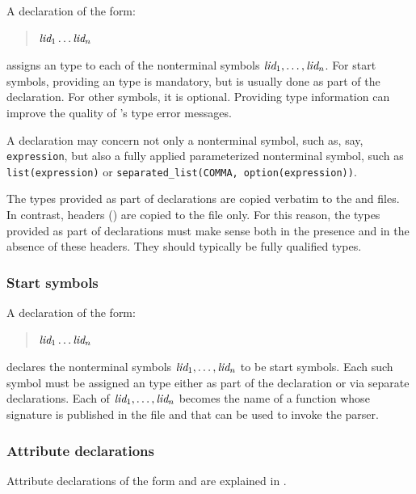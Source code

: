 \documentclass[onecolumn,11pt,nocopyrightspace,preprint]{sigplanconf}
\begin{document}
A declaration of the form:
\begin{quote}
\dtype \ocamltype $\textit{lid}_1 \ldots \textit{lid}_n$
\end{quote}
assigns an \ocaml type to each of the nonterminal symbols $\textit{lid}_1, \ldots, \textit{lid}_n$.
For start symbols, providing an \ocaml type is mandatory, but is usually done as part of the
\dstart declaration. For other symbols, it is optional. Providing type information can improve
the quality of \ocaml's type error messages.

A \dtype declaration may concern not only a nonterminal symbol, such as, say,
\texttt{expression}, but also a fully applied parameterized nonterminal
symbol, such as \texttt{list(expression)} or \texttt{separated\_list(COMMA,
  option(expression))}.

The types provided as part of \dtype declarations are copied verbatim to the
\ml and \mli files. In contrast, headers () are copied
to the \ml file only. For this reason, the types provided as part of \dtype
declarations must make sense both in the presence and in the absence of these
headers. They should typically be fully qualified types.


\subsubsection{Start symbols}
\label{sec:start}

A declaration of the form:
\begin{quote}
\dstart \optional{\ocamltype} $\textit{lid}_1 \ldots \textit{lid}_n$
\end{quote}
declares the nonterminal symbols $\textit{lid}_1, \ldots, \textit{lid}_n$ to be
start symbols. Each such symbol must be assigned an \ocaml type either as
part of the \dstart declaration or via separate \dtype declarations. Each
of $\textit{lid}_1, \ldots, \textit{lid}_n$ becomes the name of a function whose
signature is published in the \mli file and that can be used to invoke
the parser.

\subsubsection{Attribute declarations}

Attribute declarations
of the form
\dattribute {} 
and
\kw{\%} 
are explained
in .
\end{document}
